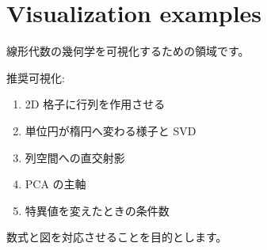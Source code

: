 \documentclass[
  11pt,
  a4paper,
]{ltjsarticle}
\author{}
\date{}
\providecommand{\tightlist}{%
  \setlength{\itemsep}{0pt}\setlength{\parskip}{0pt}}
\begin{document}
\hypertarget{visualization-examples}{%
\section{Visualization examples}\label{visualization-examples}}

線形代数の幾何学を可視化するための領域です。

推奨可視化:

\begin{enumerate}
\def\labelenumi{\arabic{enumi}.}
\tightlist
\item
  2D 格子に行列を作用させる
\item
  単位円が楕円へ変わる様子と SVD
\item
  列空間への直交射影
\item
  PCA の主軸
\item
  特異値を変えたときの条件数
\end{enumerate}

数式と図を対応させることを目的とします。
\end{document}
